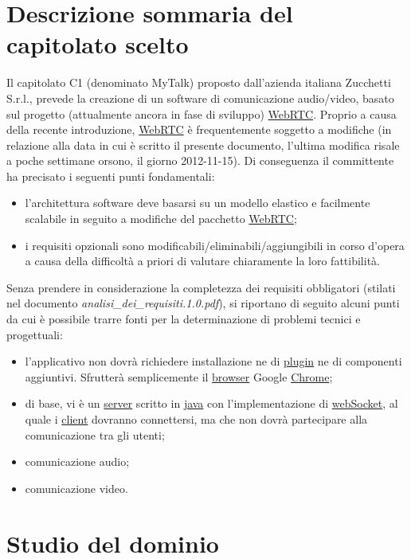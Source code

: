 \section{Descrizione sommaria del capitolato scelto}
Il capitolato C1 (denominato MyTalk) proposto dall'azienda italiana Zucchetti S.r.l., prevede la creazione di un software di comunicazione audio/video, basato sul progetto (attualmente ancora in fase di sviluppo) \underline{WebRTC}. Proprio a causa della recente introduzione, \underline{WebRTC} è frequentemente soggetto a modifiche (in relazione alla data in cui è scritto il presente documento, l'ultima modifica risale a poche settimane orsono, il giorno 2012-11-15). Di conseguenza il committente ha precisato i seguenti punti fondamentali:

\begin{itemize}
	\item l'architettura software deve basarsi su un modello elastico e facilmente scalabile in seguito a modifiche del pacchetto \underline{WebRTC};
	\item i requisiti opzionali sono modificabili/eliminabili/aggiungibili in corso d'opera a causa della difficoltà a priori di valutare chiaramente la loro fattibilità.
\end{itemize}

Senza prendere in considerazione la completezza dei requisiti obbligatori (stilati nel documento \textit{analisi\_dei\_requisiti.1.0.pdf}), si riportano di seguito alcuni punti  da cui è possibile trarre fonti per la determinazione di problemi tecnici e progettuali:

\begin{itemize}
	\item l'applicativo non dovrà richiedere installazione ne di \underline{plugin} ne di componenti aggiuntivi. Sfrutterà semplicemente il \underline{browser} Google \underline{Chrome};
	\item di base, vi è un \underline{server} scritto in \underline{java} con l'implementazione di \underline{webSocket}, al quale i \underline{client} dovranno connettersi, ma che non dovrà partecipare alla comunicazione tra gli utenti;
	\item comunicazione audio;
	\item comunicazione video.
\end{itemize}
\clearpage
\section{Studio del dominio}

